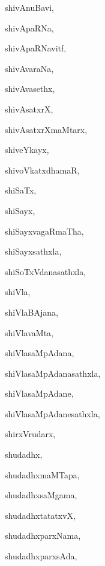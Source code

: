 \begin{multicols}{3}
{\noindent
{shivAnuBavi}, \pageref{shivAnuBavi}

\noindent
{shivApaRNa}, \pageref{shivApaRNa}

\noindent
{shivApaRNavitf}, \pageref{shivApaRNavitf}

\noindent
{shivAvaraNa}, \pageref{shivAvaraNa}

\noindent
{shivAvasethx}, \pageref{shivAvasethx}

\noindent
{shivAsatxrX}, \pageref{shivAsatxrX}

\noindent
{shivAsatxrXmaMtarx}, \pageref{shivAsatxrXmaMtarx}

\noindent
{shiveYkayx}, \pageref{shiveYkayx}

\noindent
{shivoVkatxdhamaR}, \pageref{shivoVkatxdhamaR}

\noindent
{shiSaTx}, \pageref{shiSaTx}

\noindent
{shiSayx}, \pageref{shiSayx}

\noindent
{shiSayxvagaRmaTha}, \pageref{shiSayxvagaRmaTha}

\noindent
{shiSayxsathxla}, \pageref{shiSayxsathxla}

\noindent
{shiSoTxVdanasathxla}, \pageref{shiSoTxVdanasathxla}

\noindent
{shiVla}, \pageref{shiVla}

\noindent
{shiVlaBAjana}, \pageref{shiVlaBAjana}

\noindent
{shiVlavaMta}, \pageref{shiVlavaMta}

\noindent
{shiVlasaMpAdana}, \pageref{shiVlasaMpAdana}

\noindent
{shiVlasaMpAdanasathxla}, \pageref{shiVlasaMpAdanasathxla}

\noindent
{shiVlasaMpAdane}, \pageref{shiVlasaMpAdane}

\noindent
{shiVlasaMpAdanesathxla}, \pageref{shiVlasaMpAdanesathxla}

\noindent
{shirxVrudarx}, \pageref{shirxVrudarx}

\noindent
{shudadhx}, \pageref{shudadhx}

\noindent
{shudadhxmaMTapa}, \pageref{shudadhxmaMTapa}

\noindent
{shudadhxsaMgama}, \pageref{shudadhxsaMgama}

\noindent
{shudadhxtatatxvX}, \pageref{shudadhxtatatxvX}

\noindent
{shudadhxparxNama}, \pageref{shudadhxparxNama}

\noindent
{shudadhxparxsAda}, \pageref{shudadhxparxsAda}

}
\end{multicols}
